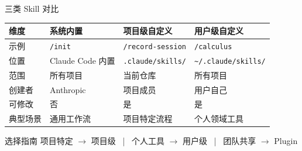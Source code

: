 \documentclass[aspectratio=169]{ctexbeamer}
\begin{document}
\begin{frame}{三类 Skill 对比}
\footnotesize

\begin{center}
\begin{tabular}{p{} p{} p{} p{}}
\toprule
\textbf{维度} & \textbf{系统内置} & \textbf{项目级自定义} & \textbf{用户级自定义} \\
\midrule
示例 & \texttt{/init} & \texttt{/record-session} & \texttt{/calculus} \\
位置 & Claude Code 内置 & \texttt{.claude/skills/} & \texttt{\~{}/.claude/skills/} \\
范围 & 所有项目 & 当前仓库 & 所有项目 \\
创建者 & Anthropic & 项目成员 & 用户自己 \\
可修改 & 否 & 是 & 是 \\
典型场景 & 通用工作流 & 项目特定流程 & 个人领域工具 \\
\bottomrule
\end{tabular}
\end{center}

\vspace{0.1cm}

\begin{block}{选择指南}
  \centering
  \footnotesize 项目特定 $\to$ 项目级 ~|~ 个人工具 $\to$ 用户级 ~|~ 团队共享 $\to$ Plugin
\end{block}
\end{frame}
\end{document}
